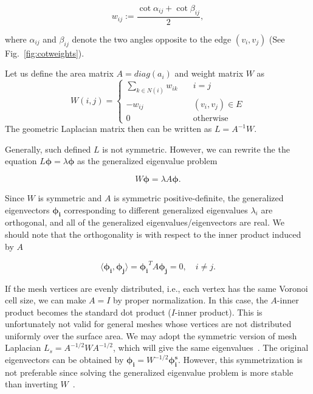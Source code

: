 \begin{equation}
w_{ij}:=\frac{\cot\alpha_{ij}+\cot\beta_{ij}}{2},
\end{equation}

where $\alpha_{ij}$ and $\beta_{ij}$ denote the two angles opposite to the edge $(v_i,v_j)$
(See Fig.~\ref{fig:cotweights}).

Let us define the area matrix $A=diag(a_i)$ and weight matrix $W$ as
\begin{equation*}
W(i,j)=\left\{
       \begin{array}{lc}
        \sum_{k\in N(i)}w_{ik}\quad & i=j \\
        -w_{ij}\quad & (v_i,v_j)\in E \\
        0\quad & \text{otherwise}
    \end{array}
\right.
\end{equation*}
The geometric Laplacian matrix then can be written as $L=A^{-1}W$.

Generally, such defined $L$ is not symmetric. However, we can rewrite the the 
equation $L\mathbf{\phi}=\lambda\mathbf{\phi}$ as the generalized eigenvalue 
problem

\begin{equation}
\label{eq:geneigen}
W\mathbf{\phi}=\lambda A\mathbf{\phi}.
\end{equation}

Since $W$ is symmetric and $A$ is symmetric positive-definite, the generalized 
eigenvectors $\mathbf{\phi_i}$ corresponding to different generalized eigenvalues 
$\lambda_i$ are orthogonal, and all of the generalized eigenvalues/eigenvectors 
are real. We should note that the orthogonality is with respect to the inner product
induced by $A$

\begin{equation}
\langle\mathbf{\phi_i},\mathbf{\phi_j}\rangle=\mathbf{\phi_i}^T A \mathbf{\phi_j}=0,\quad i\neq j.
\end{equation}

If the mesh vertices are evenly distributed, i.e., each vertex has the same Voronoi 
cell size, we can make $A=I$ by proper normalization. In this case, the $A$-inner 
product becomes the standard dot product ($I$-inner product). This is unfortunately 
not valid for general meshes whose vertices are not distributed uniformly over the 
surface area. We may adopt the symmetric version of mesh Laplacian $L_s = A^{-1/2}WA^{-1/2}$, 
which will give the same eigenvalues~\cite{Vallet2008}. The original eigenvectors can be 
obtained by $\mathbf{\phi_i}=W^{-1/2}\mathbf{\phi^s_i}$. However, this symmetrization is not 
preferable since solving the generalized eigenvalue problem is more stable than 
inverting $W$~\cite{Reuter:CG:2009}.

